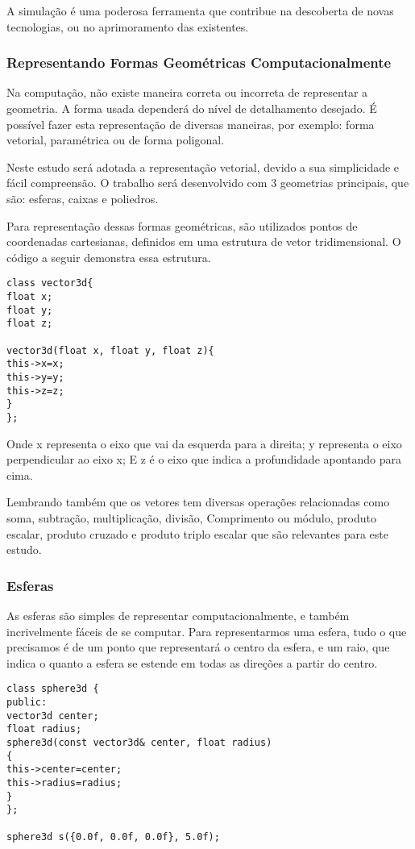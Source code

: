 A simulação é uma poderosa ferramenta que contribue na descoberta de novas
tecnologias, ou no aprimoramento das existentes.


\subsubsection{Representando Formas Geométricas Computacionalmente}
Na computação, não existe maneira correta ou incorreta de representar a
geometria. A forma usada dependerá  do nível de detalhamento desejado. É possível fazer esta representação de diversas maneiras, por exemplo: forma vetorial, paramétrica ou de forma poligonal.

Neste estudo será adotada a representação vetorial, devido a sua simplicidade e fácil compreensão. O trabalho será desenvolvido com 3 geometrias principais, que são: esferas, caixas e poliedros.

Para representação dessas formas geométricas, são utilizados pontos de coordenadas cartesianas, definidos em uma estrutura de vetor tridimensional. O código a seguir demonstra essa estrutura.

\begin{lstlisting}[frame=single,caption=Código de exemplo\label{codigo1}]
class vector3d{
float x;
float y;
float z;

vector3d(float x, float y, float z){
this->x=x;
this->y=y;
this->z=z;
}
};
\end{lstlisting}

Onde x representa o eixo que vai da esquerda para a direita;
y representa o eixo  perpendicular ao eixo x;
E z é o eixo que indica a profundidade apontando para cima.


Lembrando também que os vetores tem diversas operações relacionadas como soma,
subtração, multiplicação, divisão, Comprimento ou módulo, produto escalar,
produto cruzado e produto triplo escalar que são relevantes para este estudo.

\subsubsection{Esferas}

As esferas são simples de representar computacionalmente, e também
incrivelmente fáceis de se computar. Para representarmos uma esfera, tudo o que
precisamos é de um ponto que representará o centro da esfera, e um raio, que
indica o quanto a esfera se estende em todas as direções a partir do centro.

\begin{lstlisting}[frame=single,caption=Código de exemplo\label{codigo1}]
class sphere3d {
public:
vector3d center;
float radius;
sphere3d(const vector3d& center, float radius)
{
this->center=center;
this->radius=radius;
}
};

sphere3d s({0.0f, 0.0f, 0.0f}, 5.0f);
\end{lstlisting}

